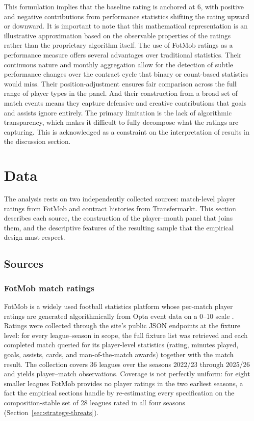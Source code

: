 \documentclass{article}
\begin{document}
This formulation implies that the baseline rating is anchored at 6, with positive and negative contributions from performance statistics shifting the rating upward or downward. It is important to note that this mathematical representation is an illustrative approximation based on the observable properties of the ratings rather than the proprietary algorithm itself.
The use of FotMob ratings as a performance measure offers several advantages over traditional statistics. Their continuous nature and monthly aggregation allow for the detection of subtle performance changes over the contract cycle that binary or count-based statistics would miss. Their position-adjustment ensures fair comparison across the full range of player types in the panel. And their construction from a broad set of match events means they capture defensive and creative contributions that goals and assists ignore entirely. The primary limitation is the lack of algorithmic transparency, which makes it difficult to fully decompose what the ratings are capturing. This is acknowledged as a constraint on the interpretation of results in the discussion section.





\section{Data}
\label{sec:data}

The analysis rests on two independently collected sources: match-level player
ratings from FotMob and contract histories from Transfermarkt. This section
describes each source, the construction of the player--month panel that joins
them, and the descriptive features of the resulting sample that the empirical
design must respect.

\subsection{Sources}
\label{sec:data-sources}

\subsubsection{FotMob match ratings}

FotMob is a widely used football statistics platform whose per-match player
ratings are generated algorithmically from Opta event data on a 0--10 scale
\citep{fotmob_faq, statsperform_opta}. Ratings were collected through the
site's public JSON endpoints at the fixture level: for every league--season in
scope, the full fixture list was retrieved and each completed match queried for
its player-level statistics (rating, minutes played, goals, assists, cards, and
man-of-the-match awards) together with the match result. The collection covers
36 leagues over the seasons 2022/23 through 2025/26 and yields \NMatchRatings{}
player--match observations. Coverage is not perfectly uniform: for eight
smaller leagues FotMob provides no player ratings in the two earliest seasons,
a fact the empirical sections handle by re-estimating every specification on
the composition-stable set of 28 leagues rated in all four seasons
(Section~\ref{sec:strategy-threats}).
\end{document}
